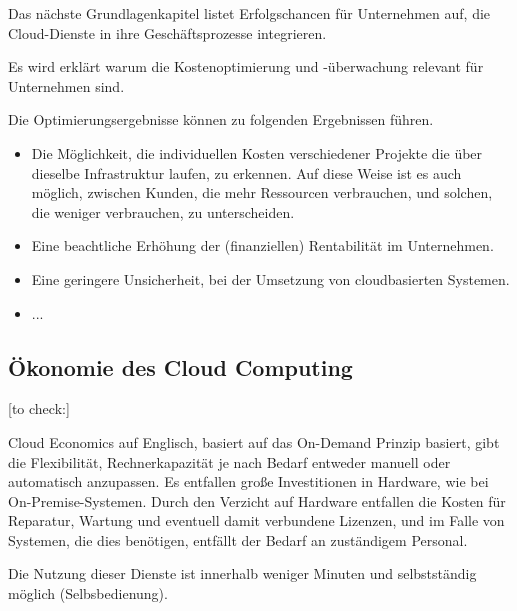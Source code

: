 Das nächste Grundlagenkapitel listet Erfolgschancen für Unternehmen auf, die Cloud-Dienste in ihre Geschäftsprozesse integrieren.

\begin{flushleft}
      Es wird erklärt warum die Kostenoptimierung und -überwachung relevant für Unternehmen sind.
\end{flushleft}


Die Optimierungsergebnisse können zu folgenden Ergebnissen führen.
\begin{itemize}
      \item
            Die Möglichkeit, die individuellen Kosten verschiedener Projekte die über dieselbe Infrastruktur laufen, zu erkennen. Auf diese Weise ist es auch möglich, zwischen Kunden, die mehr Ressourcen verbrauchen, und solchen, die weniger verbrauchen, zu unterscheiden.
      \item
            Eine beachtliche Erhöhung der (finanziellen) Rentabilität im Unternehmen.
      \item
            Eine geringere Unsicherheit, bei der Umsetzung von cloudbasierten Systemen.
      \item
            ...
\end{itemize}




\subsection{Ökonomie des Cloud Computing}\label{subsec_UabsGrund3}
[to check:]
\begin{flushleft}
      {
            Cloud Economics auf Englisch, basiert auf das On-Demand Prinzip basiert,
            gibt die Flexibilität, Rechnerkapazität je nach Bedarf entweder manuell oder automatisch anzupassen.
            Es entfallen große Investitionen in Hardware, wie bei On-Premise-Systemen.
            Durch den Verzicht auf Hardware entfallen die Kosten für Reparatur, Wartung und eventuell damit verbundene Lizenzen, und im Falle von Systemen, die dies benötigen, entfällt der Bedarf an zuständigem Personal.

            Die Nutzung dieser Dienste ist innerhalb weniger Minuten und selbstständig möglich (Selbsbedienung). }
\end{flushleft}

